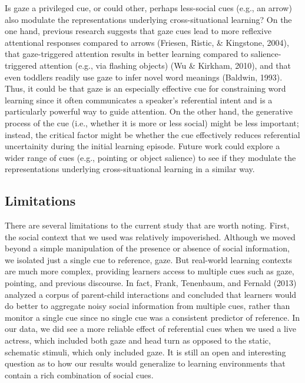 \documentclass[authoryear, review]{elsarticle}
\begin{document}
Is gaze a privileged cue, or could other, perhaps less-social cues
(e.g., an arrow) also modulate the representations underlying
cross-situational learning? On the one hand, previous research suggests
that gaze cues lead to more reflexive attentional responses compared to
arrows (Friesen, Ristic, \& Kingstone, 2004), that gaze-triggered
attention results in better learning compared to salience-triggered
attention (e.g., via flashing objects) (Wu \& Kirkham, 2010), and that
even toddlers readily use gaze to infer novel word meanings (Baldwin,
1993). Thus, it could be that gaze is an especially effective cue for
constraining word learning since it often communicates a speaker's
referential intent and is a particularly powerful way to guide
attention. On the other hand, the generative process of the cue (i.e.,
whether it is more or less social) might be less important; instead, the
critical factor might be whether the cue effectively reduces referential
uncertainity during the initial learning episode. Future work could
explore a wider range of cues (e.g., pointing or object salience) to see
if they modulate the representations underlying cross-situational
learning in a similar way.

\subsection{Limitations}\label{limitations}

There are several limitations to the current study that are worth
noting. First, the social context that we used was relatively
impoverished. Although we moved beyond a simple manipulation of the
presence or absence of social information, we isolated just a single cue
to reference, gaze. But real-world learning contexts are much more
complex, providing learners access to multiple cues such as gaze,
pointing, and previous discourse. In fact, Frank, Tenenbaum, and Fernald
(2013) analyzed a corpus of parent-child interactions and concluded that
learners would do better to aggregate noisy social information from
multiple cues, rather than monitor a single cue since no single cue was
a consistent predictor of reference. In our data, we did see a more
reliable effect of referential cues when we used a live actress, which
included both gaze and head turn as opposed to the static, schematic
stimuli, which only included gaze. It is still an open and interesting
question as to how our results would generalize to learning environments
that contain a rich combination of social cues.
\end{document}
